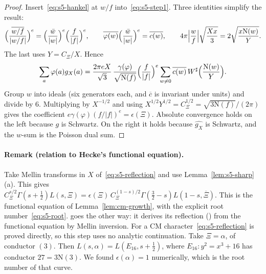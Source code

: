 \documentclass[11pt]{article}
\numberwithin{equation}{section}
\newcommand{\N}{\mathrm N}
\begin{document}
\begin{proof}
Insert~\eqref{eq:s5-hankel} at $w/f$ into~\eqref{eq:s5-step1}. Three identities simplify the result:
\begin{equation}\label{eq:d179}
 \Bigl(\frac{\overline{w/f}}{|w/f|}\Bigr)^e=\Bigl(\frac{\bar w}{|w|}\Bigr)^e\Bigl(\frac f{|f|}\Bigr)^e,\qquad
 \overline{\varphi(w)}\Bigl(\frac{\bar w}{|w|}\Bigr)^e=\overline{c(w)},\qquad
 4\pi\Bigl|\frac wf\Bigr|\sqrt{\frac{Xx}3}=2\sqrt{\frac{x\N(w)}Y}.
\end{equation}
The last uses $Y=C_\Xi/X$. Hence
\begin{equation}\label{eq:d180}
 \sum_{a}\varphi(a)g_X(a)=\frac{2\pi eX}{\sqrt3}\,\frac{\gamma(\varphi)}{\sqrt{\N(f)}}\Bigl(\frac f{|f|}\Bigr)^e
 \sum_{w\ne0}\overline{c(w)}\,W^\sharp\Bigl(\frac{\N(w)}Y\Bigr).
\end{equation}
Group $w$ into ideals (six generators each, and $\overline c$ is invariant under units) and divide by $6$.
Multiplying by $X^{-1/2}$ and using $X^{1/2}Y^{1/2}=C_\Xi^{1/2}=\sqrt{3\N(f)}/(2\pi)$ gives the
coefficient $e\gamma(\varphi)(f/|f|)^e=\epsilon(\Xi)$. Absolute convergence holds on the left because $g$
is Schwartz. On the right it holds because $\widehat{g_X}$ is Schwartz, and the $w$-sum is the Poisson dual
sum.
\end{proof}

\paragraph{Remark (relation to Hecke's functional equation).} Take Mellin transforms in $X$
of~\eqref{eq:s5-reflection} and use Lemma~\ref{lem:s5-sharp}(a). This gives
$C_\Xi^{s/2}\Gamma(s+\frac12)L(s,\Xi)=\epsilon(\Xi)\,C_\Xi^{(1-s)/2}\Gamma(\frac32-s)L(1-s,\overline\Xi)$.
This is the functional equation of Lemma~\ref{lem:cm-growth}, with the explicit root
number~\eqref{eq:s5-root}. \cite{OAI78} goes the other way: it derives its reflection (\cite[Section~18.1]{OAI78})
from the functional equation by Mellin inversion. For a CM character~\eqref{eq:s5-reflection} is proved
directly, so this step uses no analytic continuation. Take $\Xi=\alpha$, of conductor $(3)$. Then
$L(s,\alpha)=L(E_{16},s+\frac12)$, where $E_{16}\colon y^2=x^3+16$ has conductor $27=3\N(3)$. We found
$\epsilon(\alpha)=1$ numerically, which is the root number of that curve.
\end{document}
